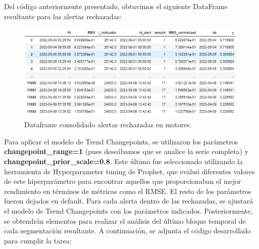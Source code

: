 \documentclass{article}[14pts]
\begin{document}
  Del código anteriormente presentado, obtuvimos el siguiente DataFrame resultante para las alertas rechazadas:
    \begin{center}
      \begin{figure}[h]
        \centering
        \includegraphics[width=.85\textwidth]{images/94.png}
        \caption{Dataframe consolidado alertas rechazadas en motores.}
      \end{figure}    
    \end{center}
  

  Para aplicar el modelo de Trend Changepoints, se utilizaron los parámetros \textbf{changepoint\_range=1} (pues deseábamos que se analice la serie completa) y \textbf{changepoint\_prior\_scale=0.8}. Este último fue seleccionado utilizando la herramienta de Hyperparameter tuning de Prophet, que evaluó diferentes valores de este hiperparámetro para encontrar aquellos que proporcionaban el mejor rendimiento en términos de métricas como el RMSE. El resto de los parámetros fueron dejados en default. Para cada alerta dentro de las rechazadas, se ajustará el modelo de Trend Changepoints con los parámetros indicados. Posteriormente, se obtendrán elementos para realizar el análisis del último bloque temporal de cada segmentación resultante. A continuación, se adjunta el código desarrollado para cumplir la tarea:
\end{document}
